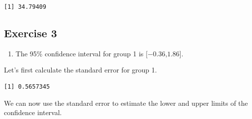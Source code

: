\documentclass[
  letterpaper,
  DIV=11,
  numbers=noendperiod]{scrreprt}
\newenvironment{Shaded}{\begin{snugshade}}{\end{snugshade}}
\newcommand{\DecValTok}[1]{\textcolor[rgb]{0.68,0.00,0.00}{#1}}
\newcommand{\FloatTok}[1]{\textcolor[rgb]{0.68,0.00,0.00}{#1}}
\newcommand{\FunctionTok}[1]{\textcolor[rgb]{0.28,0.35,0.67}{#1}}
\newcommand{\NormalTok}[1]{\textcolor[rgb]{0.00,0.23,0.31}{#1}}
\newcommand{\OtherTok}[1]{\textcolor[rgb]{0.00,0.23,0.31}{#1}}
\newcommand{\SpecialCharTok}[1]{\textcolor[rgb]{0.37,0.37,0.37}{#1}}
\providecommand{\tightlist}{%
  \setlength{\itemsep}{0pt}\setlength{\parskip}{0pt}}\usepackage{longtable,booktabs,array}
\begin{document}
\begin{verbatim}
[1] 34.79409
\end{verbatim}

\hypertarget{exercise-3-23}{%
\subsection*{Exercise 3}\label{exercise-3-23}}

\begin{blackbox}

\begin{enumerate}
\def\labelenumi{\arabic{enumi}.}
\tightlist
\item
  The 95\% confidence interval for group 1 is {[}\(-0.36\),\(1.86\){]}.
\end{enumerate}

\end{blackbox}

Let's first calculate the standard error for group 1.

\begin{Shaded}
\end{Shaded}

\begin{verbatim}
[1] 0.5657345
\end{verbatim}

We can now use the standard error to estimate the lower and upper limits
of the confidence interval.

\begin{Shaded}
\end{Shaded}
\end{document}
